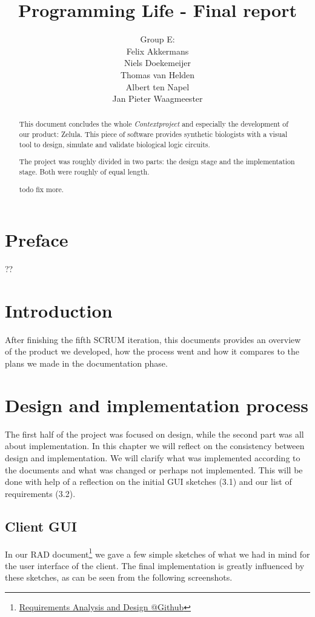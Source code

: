 \documentclass[a4paper]{article}
\title{Programming Life - Final report}
\author{Group E:\\
Felix Akkermans \\
Niels Doekemeijer \\
Thomas van Helden \\
Albert ten Napel \\
Jan Pieter Waagmeester}
\makeatletter
\newcommand{\urlRAD}{https://github.com/FelixAkk/synthbio/raw/master/deliverables/rad/rad.pdf}
\newcommand{\hrefRAD}{\href{\urlRAD}{Requirements Analysis and Design @Github}}
\makeatother
\begin{document}
\maketitle
\thispagestyle{empty}
\vfill

\small{\tableofcontents}
\pagebreak{}

\section*{Preface} ??


\pagebreak
\begin{abstract}
\noindent This document concludes the whole \textit{Contextproject} and especially the development of our product: Zelula. This piece of software provides synthetic biologists with a visual tool to design, simulate and validate biological logic circuits.

The project was roughly divided in two parts: the design stage and the implementation stage. Both were roughly of equal length.

todo fix more.
\end{abstract}
\pagebreak

\section{Introduction}
After finishing the fifth SCRUM iteration, this documents provides an overview of the product we developed, how the process went and how it compares to the plans we made in the documentation phase. 




\section{Design and implementation process}
The first half of the project was focused on design, while the second part was all about implementation. In this chapter we will reflect on the consistency between design and implementation. We will clarify what was implemented according to the documents and what was changed or perhaps not implemented. This will be done with help of a reflection on the initial GUI sketches (3.1) and our list of requirements (3.2).

\subsection{Client GUI}
In our RAD document\footnote{\hrefRAD} we gave a few simple sketches of what we had in mind for the user interface of the client. The final implementation is greatly influenced by these sketches, as can be seen from the following screenshots.\\
\end{document}
